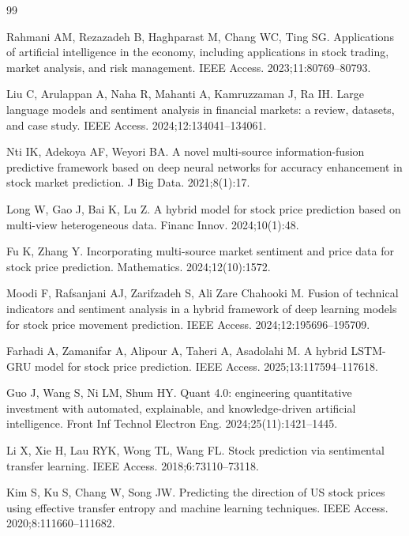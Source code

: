 \documentclass[12pt,a4paper]{article}
\begin{document}
\renewcommand{\refname}{}
\vspace{-2\baselineskip}   %
\begin{singlespace}
\begin{thebibliography}{99}

Rahmani AM, Rezazadeh B, Haghparast M, Chang WC, Ting SG. Applications
of artificial intelligence in the economy, including applications in stock
trading, market analysis, and risk management. IEEE Access.
2023;11:80769--80793.

Liu C, Arulappan A, Naha R, Mahanti A, Kamruzzaman J, Ra IH. Large language
models and sentiment analysis in financial markets: a review, datasets, and
case study. IEEE Access. 2024;12:134041--134061.

Nti IK, Adekoya AF, Weyori BA. A novel multi-source information-fusion
predictive framework based on deep neural networks for accuracy enhancement
in stock market prediction. J Big Data. 2021;8(1):17.

Long W, Gao J, Bai K, Lu Z. A hybrid model for stock price prediction based
on multi-view heterogeneous data. Financ Innov. 2024;10(1):48.

Fu K, Zhang Y. Incorporating multi-source market sentiment and price data
for stock price prediction. Mathematics. 2024;12(10):1572.

Moodi F, Rafsanjani AJ, Zarifzadeh S, Ali Zare Chahooki M. Fusion of
technical indicators and sentiment analysis in a hybrid framework of deep
learning models for stock price movement prediction. IEEE Access.
2024;12:195696--195709.

Farhadi A, Zamanifar A, Alipour A, Taheri A, Asadolahi M. A hybrid
LSTM-GRU model for stock price prediction. IEEE Access.
2025;13:117594--117618.

Guo J, Wang S, Ni LM, Shum HY. Quant 4.0: engineering quantitative
investment with automated, explainable, and knowledge-driven artificial
intelligence. Front Inf Technol Electron Eng. 2024;25(11):1421--1445.

Li X, Xie H, Lau RYK, Wong TL, Wang FL. Stock prediction via sentimental
transfer learning. IEEE Access. 2018;6:73110--73118.

Kim S, Ku S, Chang W, Song JW. Predicting the direction of US stock prices
using effective transfer entropy and machine learning techniques. IEEE Access.
2020;8:111660--111682.


\end{thebibliography}
\end{singlespace}
\end{document}
